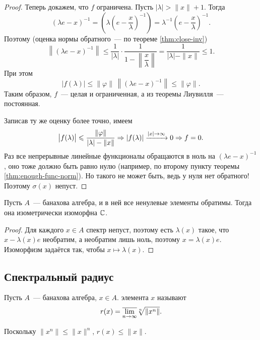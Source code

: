 \documentclass{notes}
\begin{document}
\begin{thm}
\begin{proof}
			Теперь докажем, что $f$ ограничена. Пусть $|\lambda| > \|x\| + 1$. Тогда
			\[
				(\lambda e - x)^{-1} = \left(\lambda\left(e - \dfrac{x}{\lambda}\right)^{-1}\right) = \lambda^{-1} \left(e - \dfrac{x}{\lambda}\right)^{-1}.
			\]
			Поэтому (оценка нормы обратного~--- по теореме \ref{thm:close-inv})
			\[
				\left\|(\lambda e - x)^{-1}\right\| \leqslant \dfrac{1}{|\lambda|} \cdot \dfrac{1}{1 - \left\|\dfrac{x}{\lambda}\right\|} = \dfrac{1}{|\lambda| - \|x\|} \leqslant 1.
			\]
			При этом
			\[
				\big|f(\lambda)\big| \leqslant \|\varphi\| \, \left\|(\lambda e - x)^{-1}\right\| \leqslant \|\varphi\|.
			\]
			Таким образом, $f$~--- целая и ограниченная, а из теоремы Лиувилля~--- постоянная.

			Записав ту же оценку более точно, имеем
			\[
				\big|f(\lambda)\big| \leqslant \dfrac{\|\varphi\|}{|\lambda| - \|x\|} \Rightarrow |f(\lambda)| \xrightarrow{|x| \to \infty} 0 \Rightarrow f = 0.
			\]
			Раз все непрерывные линейные функционалы обращаются в ноль на $(\lambda e - x)^{-1}$, оно тоже должно быть равно нулю (например, по второму пункту теоремы \ref{thm:enough-func-norm}). Но такого не может быть, ведь у нуля нет обратного! Поэтому $\sigma(x)$ непуст.
		\end{proof}
	\end{thm}

	\begin{thm}
		Пусть $A$~--- банахова алгебра, и в ней все ненулевые элементы обратимы. Тогда она изометрически изоморфна $\mathbb{C}$.
		\begin{proof}
			Для каждого $x \in A$ спектр непуст, поэтому есть $\lambda(x)$ такое, что $x - \lambda(x) e$ необратим, а необратим лишь ноль, поэтому $x = \lambda(x) e$. Изоморфизм задаётся так, чтобы $x \mapsto \lambda(x)$.
		\end{proof}
	\end{thm}

\subsection{Спектральный радиус}

	\begin{de}
		Пусть $A$~--- банахова алгебра, $x \in A$.  элемента $x$ называют
		\[
			r(x) = \overline{\lim\limits_{n \to \infty}} \sqrt[n]{\|x^n\|}.
		\]
	\end{de}

	\begin{rem}
		Поскольку $\|x^n\| \leqslant \|x\|^n$, $r(x) \leqslant \|x\|$.
	\end{rem}
\end{document}
